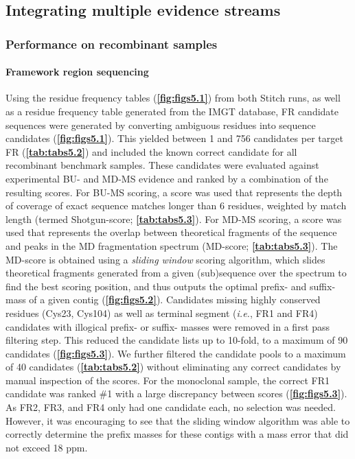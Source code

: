 \subsection{Integrating multiple evidence streams}

\subsubsection{Performance on recombinant samples}

\paragraph{Framework region sequencing}
\label{ch:fr}
Using the residue frequency tables (\textbf{\autoref{fig:figs5.1}}) from both Stitch runs, as well as a residue frequency table generated from the IMGT database, FR candidate sequences were generated by converting ambiguous residues into sequence candidates (\textbf{\autoref{fig:figs5.1}}). This yielded between 1 and 756 candidates per target FR (\textbf{\autoref{tab:tabs5.2}}) and included the known correct candidate for all recombinant benchmark samples. These candidates were evaluated against experimental BU- and MD-MS evidence and ranked by a combination of the resulting scores. For BU-MS scoring, a score was used that represents the depth of coverage of exact sequence matches longer than 6 residues, weighted by match length (termed Shotgun-score; \textbf{\autoref{tab:tabs5.3}}). For MD-MS scoring, a score was used that represents the overlap between theoretical fragments of the sequence and peaks in the MD fragmentation spectrum (MD-score; \textbf{\autoref{tab:tabs5.3}}). The MD-score is obtained using a \emph{sliding window} scoring algorithm, which slides theoretical fragments generated from a given (sub)sequence over the spectrum to find the best scoring position, and thus outputs the optimal prefix- and suffix- mass of a given contig (\textbf{\autoref{fig:figs5.2}}). Candidates missing highly conserved residues (Cys23, Cys104) as well as terminal segment (\emph{i.e.}, FR1 and FR4) candidates with illogical prefix- or suffix- masses were removed in a first pass filtering step. This reduced the candidate lists up to 10-fold, to a maximum of 90 candidates (\textbf{\autoref{fig:figs5.3}}).
We further filtered the candidate pools to a maximum of 40 candidates (\textbf{\autoref{tab:tabs5.2}}) without eliminating any correct candidates by manual inspection of the scores. For the monoclonal sample, the correct FR1 candidate was ranked \#1 with a large discrepancy between scores (\textbf{\autoref{fig:figs5.3}}). As FR2, FR3, and FR4 only had one candidate each, no selection was needed. However, it was encouraging to see that the sliding window algorithm was able to correctly determine the prefix masses for these contigs with a mass error that did not exceed 18 ppm.
